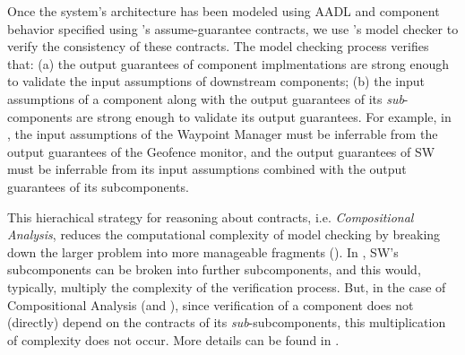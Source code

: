 
Once the system's architecture has been modeled using AADL
and component behavior specified using \agree's assume-guarantee contracts,
we use \agree's model checker to verify the consistency of these contracts.
The model checking process verifies that:
(a) the output guarantees of component implmentations are strong enough to
validate the input assumptions of downstream components;
(b) the input assumptions of a component along with the output guarantees of its \emph{sub}-components
are strong enough to validate its output guarantees.
For example, in ,
the input assumptions of the Waypoint Manager must be inferrable from
the output guarantees of the Geofence monitor, 
and the output guarantees of SW must be inferrable from
its input assumptions combined with the output guarantees of its subcomponents.

This hierachical strategy for reasoning about contracts,
i.e. \emph{Compositional Analysis},
reduces the computational complexity of model checking
by breaking down the larger problem into more manageable fragments (\cite{compositional-analysis-agree}).
In , SW's subcomponents can be broken into further subcomponents,
and this would, typically, multiply the complexity of the verification process.
But, in the case of Compositional Analysis (and \agree),
since verification of a component does not (directly) depend on the contracts of its \emph{sub}-subcomponents,
this multiplication of complexity does not occur.
More details can be found in \cite{case-models-2021}.
